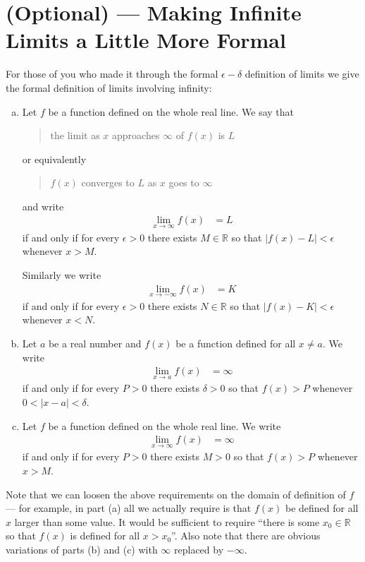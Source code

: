 \section{(Optional) --- Making Infinite Limits a Little More Formal}
\label{sec lim inf formal}
For those of you who made it through the formal $\epsilon-\delta$ definition of
limits we give the formal definition of limits involving infinity:
\begin{defn}\label{def_1_8_1}
\begin{enumerate}[(a)]
\item 
 Let $f$ be a function defined on the whole real line. We say that
\begin{quote}
  the limit as $x$ approaches $\infty$ of $f(x)$ is $L$
\end{quote}
or equivalently
\begin{quote}
 $f(x)$ converges to $L$ as $x$ goes to $\infty$
\end{quote}
and write
\begin{align*}
  \lim_{x \to \infty} f(x) &= L
\end{align*}
if and only if for every $\epsilon>0$ there exists $M \in \mathbb{R}$ so that
$|f(x)-L| < \epsilon$ whenever $x>M$.

Similarly we write
\begin{align*}
  \lim_{x \to -\infty} f(x) &= K
\end{align*}
if and only if for every $\epsilon>0$ there exists $N \in \mathbb{R}$ so that
$|f(x)-K| < \epsilon$ whenever $x<N$.

\item 
 Let $a$ be a real number and $f(x)$ be a function defined for all $x\ne a$.
We write
\begin{align*}
  \lim_{x \to a} f(x) &= \infty
\end{align*}
if and only if for every $P >0$  there exists $\delta>0$ so that
$f(x) > P$ whenever $0<|x-a|<\delta$.

\item 
Let $f$ be a function defined on the whole real line. We write
\begin{align*}
  \lim_{x \to \infty} f(x) &= \infty
\end{align*}
if and only if for every $P > 0$  there exists $M>0$ so that
$f(x) > P$ whenever $x>M$.

\end{enumerate}

\end{defn}
Note that we can loosen the above requirements on the domain of definition of $f$ --- for example, in part (a) all we actually require is that $f(x)$ be
defined for all $x$ larger than some value. It would be sufficient to 
require ``there is some $x_0 \in \mathbb{R}$ so that $f(x)$ is
defined for all $x>x_0$''. Also note that there are obvious variations of parts (b) and (c) with $\infty$ replaced by $-\infty$.

